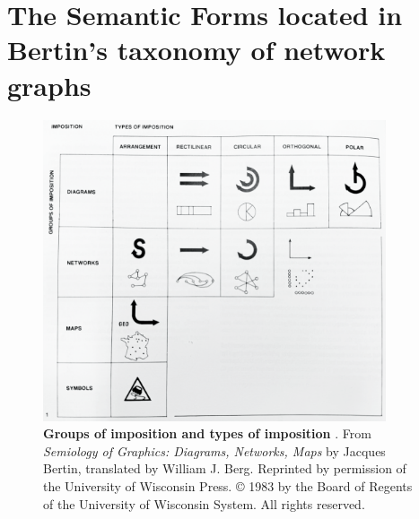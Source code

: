 \section{The Semantic Forms located in Bertin’s taxonomy of network graphs}
\begin{figure}[h!]
    \centering
    \includegraphics[width=0.9\textwidth]{figures/A.3.png}
    \caption[Groups of imposition and types of imposition]{\textbf{Groups of imposition and types of imposition} \citep[p. 52]{bertin_semiology_2011}.
From \textit{Semiology of Graphics: Diagrams, Networks, Maps} by Jacques Bertin, translated by William J. Berg. Reprinted by permission of the University of Wisconsin Press. © 1983 by the Board of Regents of the University of Wisconsin System. All rights reserved.}
    \label{fig:A3}
\end{figure}
